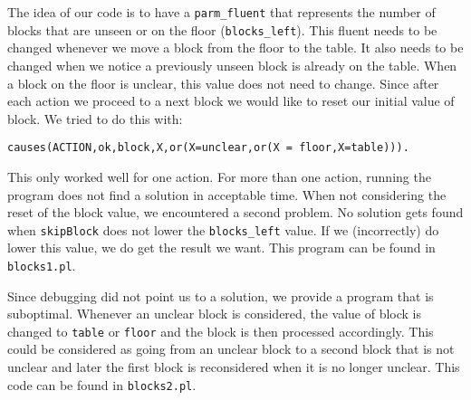 \documentclass{article}
\begin{document}
The idea of our code is to have a \texttt{parm\_fluent} that represents the number of blocks that are unseen or on the floor (\texttt{blocks\_left}). This fluent needs to be changed whenever we move a block from the floor to the table. It also needs to be changed when we notice a previously unseen block is already on the table. When a block on the floor is unclear, this value does not need to change.
Since after each action we proceed to a next block we would like to reset our initial value of block. We tried to do this with:
\begin{verbatim}
causes(ACTION,ok,block,X,or(X=unclear,or(X = floor,X=table))).
\end{verbatim}
This only worked well for one action. For more than one action, running the program does not find a solution in acceptable time.
When not considering the reset of the block value, we encountered a second problem. No solution gets found when \texttt{skipBlock} does not lower the \texttt{blocks\_left} value. If we (incorrectly) do lower this value, we do get the result we want. This program can be found in \texttt{blocks1.pl}.

Since debugging did not point us to a solution, we provide a program that is suboptimal. Whenever an unclear block is considered, the value of block is changed to \texttt{table} or \texttt{floor} and the block is then processed accordingly. This could be considered as going from an unclear block to a second block that is not unclear and later the first block is reconsidered when it is no longer unclear. This code can be found in \texttt{blocks2.pl}.
\end{document}

